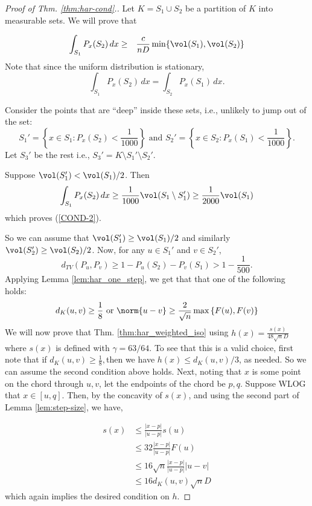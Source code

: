 \begin{proof}[Proof of Thm. \ref{thm:har-cond}.]
 Let $K=S_{1}\cup S_{2}$ be a partition of $K$ into measurable
sets. We will prove that

\begin{eqnarray}
\int_{S_{1}}P_{x}(S_{2})\,dx & \ge & \frac{c}{nD}\min\{\vol(S_{1}),\vol(S_{2})\}\label{COND-2}
\end{eqnarray}
Note that since the uniform distribution is stationary, 
\[
\int_{S_{1}}P_{x}(S_{2})\,dx=\int_{S_{2}}P_{x}(S_{1})\,dx.
\]

Consider the points that are ``deep'' inside these sets, i.e., unlikely
to jump out of the set: 
\[
S_{1}'=\left\{ x\in S_{1}:P_{x}(S_{2})<\frac{1}{1000}\right\} \mbox{ and }S_{2}'=\left\{ x\in S_{2}:P_{x}(S_{1})<\frac{1}{1000}\right\} .
\]
Let $S_{3}'$ be the rest i.e., $S_{3}'=K\setminus S_{1}'\setminus S_{2}'$.

Suppose $\vol(S_{1}')<\vol(S_{1})/2$. Then 
\[
\int_{S_{1}}P_{x}(S_{2})\,dx\ge\frac{1}{1000}\vol(S_{1}\setminus S_{1}')\geq\frac{1}{2000}\vol(S_{1})
\]
which proves (\ref{COND-2}).

So we can assume that $\vol(S_{1}')\geq\vol(S_{1})/2$ and similarly
$\vol(S_{2}')\geq\vol(S_{2})/2$. Now, for any $u\in S_{1}'$ and
$v\in S_{2}'$, 
\[
d_{TV}(P_{u},P_{v})\geq1-P_{u}(S_{2})-P_{v}(S_{1})>1-\frac{1}{500}.
\]
Applying Lemma \ref{lem:har_one_step}, we get that that one of the
following holds:
\[
d_{K}(u,v)\ge\frac{1}{8}\mbox{ or }\norm{u-v}\ge\frac{2}{\sqrt{n}}\max\left\{ F(u),F(v)\right\} 
\]
We will now prove that Thm. \ref{thm:har_weighted_iso} using $h(x)=\frac{s(x)}{48\sqrt{n}D}$
where $s(x)$ is defined with $\gamma=63/64.$ To see that this is
a valid choice, first note that if $d_{K}(u,v)\ge\frac{1}{8},$then
we have $h(x)\le d_{K}(u,v)/3$, as needed. So we can assume the second
condition above holds. Next, noting that $x$ is some point on the
chord through $u,v$, let the endpoints of the chord be $p,q.$ Suppose
WLOG that $x\in[u,q]$. Then, by the concavity of $s(x)$, and using
the second part of Lemma \ref{lem:step-size}, we have,

\begin{align*}
s(x) & \le\frac{|x-p|}{|u-p|}s(u)\\
 & \le32\frac{|x-p|}{|u-p|}F(u)\\
 & \le16\sqrt{n}\frac{|x-p|}{|u-p|}\left|u-v\right|\\
 & \le16d_{K}(u,v)\sqrt{n}D
\end{align*}
which again implies the desired condition on $h$. 


\end{proof}
